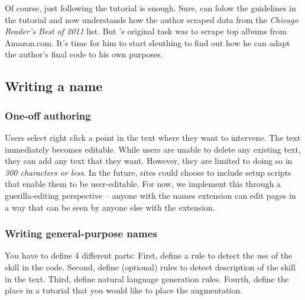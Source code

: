 Of course, just following the tutorial is enough.
Sure, \user{} can folow the guidelines in the tutorial and now understands how the author scraped data from the \emph{Chicago Reader's Best of 2011} list.
But \user's original task was to scrape top albums from Amazon.com.
It's time for him to start sleuthing to find out how he can adapt the author's final code to his own purposes.


\subsection{Writing a \gls{name}}

\subsubsection{One-off authoring}

Users select right click a point in the text where they want to intervene.
The text immediately becomes editable.
While users are unable to delete any existing text, they can add any text that they want.
However, they are limited to doing so in \emph{300 characters or less}.
In the future, sites could choose to include setup scripts that enable them to be user-editable.
For now, we implement this through a guerilla-editing perspective -- anyone with the \Glspl{name} extension can edit pages in a way that can be seen by anyone else with the extension.

\subsubsection{Writing general-purpose \glspl{name}}

You have to define 4 different parts:
First, define a rule to detect the use of the skill in the code.
Second, define (optional) rules to detect description of the skill in the text.
Third, define natural language generation rules.
Fourth, define the place in a tutorial that you would like to place the augmentation.

